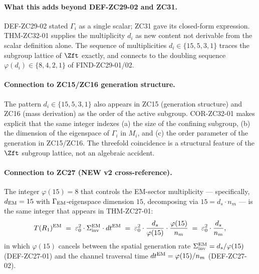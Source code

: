 \documentclass[12pt, a4paper]{article}
\begin{document}
\paragraph{What this adds beyond DEF-ZC29-02 and ZC31.}
DEF-ZC29-02 stated $\Gamma_i$ as a single scalar; ZC31 gave
its closed-form expression. THM-ZC32-01 supplies the
multiplicity $d_i$ as new content not derivable from the
scalar definition alone. The sequence of multiplicities
$d_i \in \{15, 5, 3, 1\}$ traces the subgroup lattice of
$\Zft$ exactly, and connects to the doubling sequence
$\varphi(d_i) \in \{8, 4, 2, 1\}$ of FIND-ZC29-01/02.

\paragraph{Connection to ZC15/ZC16 generation structure.}
The pattern $d_i \in \{15, 5, 3, 1\}$ also appears in ZC15
(generation structure) and ZC16 (mass derivation) as the
order of the active subgroup. COR-ZC32-01 makes explicit
that the same integer indexes (a) the size of the confining
subgroup, (b) the dimension of the eigenspace of
$\Gamma_i$ in $M_i$, and (c) the order parameter of the
generation in ZC15/ZC16. The threefold coincidence is a
structural feature of the $\Zft$ subgroup lattice, not an
algebraic accident.

\paragraph{Connection to ZC27 (NEW v2 cross-reference).}
The integer $\varphi(15) = 8$ that controls the EM-sector
multiplicity --- specifically, $d_{\rm EM} = 15$ with
$\Gamma_{\rm EM}$-eigenspace dimension $15$, decomposing
via $15 = d_s \cdot n_m$ --- is the same integer that
appears in THM-ZC27-01:
\[
  T(R_1)^{\rm EM}
    \;=\; \varepsilon_0^2 \cdot \Sigma_{\rm inv}^{\rm EM}
      \cdot dt^{\rm EM}
    \;=\; \varepsilon_0^2 \cdot \frac{d_s}{\varphi(15)}
      \cdot \frac{\varphi(15)}{n_m}
    \;=\; \varepsilon_0^2 \cdot \frac{d_s}{n_m},
\]
in which $\varphi(15)$ cancels between the spatial generation
rate $\Sigma_{\rm inv}^{\rm EM} = d_s/\varphi(15)$ (DEF-ZC27-01)
and the channel traversal time
$dt^{\rm EM} = \varphi(15)/n_m$ (DEF-ZC27-02).
\end{document}
